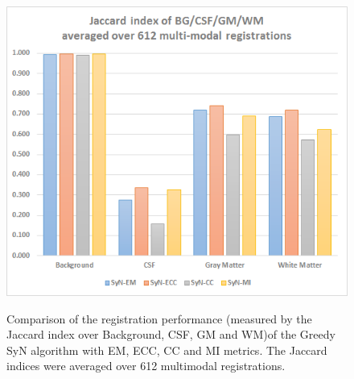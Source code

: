\begin{figure}[H]
\centering
\includegraphics[width=0.5\linewidth]{./images/multi_graph_segTri_fill.png}\\
\caption{Comparison of the registration performance (measured by the Jaccard index over Background, CSF, GM and WM)of the Greedy SyN algorithm with EM, ECC, CC and MI metrics. The Jaccard
indices were averaged over 612 multimodal registrations.}
\label{fig:multi_graph_segTri_fill}
\end{figure}
